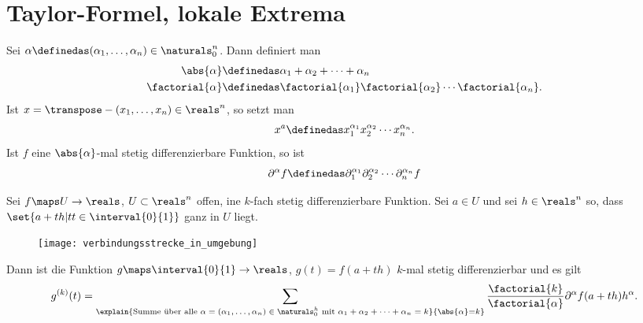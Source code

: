 \section{Taylor-Formel, lokale Extrema}
\begin{notation}
  Sei \( \alpha\definedas(\alpha_1,\dotsc,\alpha_n)\in \naturals_{0}^n \). Dann definiert man
  \begin{align*}
    \abs{\alpha}&\definedas\alpha_1+\alpha_2+\dotsb+\alpha_n\\
    \factorial{\alpha}&\definedas \factorial{\alpha_1}\factorial{\alpha_2}\dotsb\factorial{\alpha_n}.
  \end{align*}
  Ist \( x=\transpose-{(x_1,\dotsc,x_n)}\in \reals^n \), so setzt man 
  \begin{equation*}
    x^{a}\definedas x_1^{\alpha_1}x_2^{\alpha_2}\dotsb x_n^{\alpha_n}.
  \end{equation*}
  Ist \( f \) eine \( \abs{\alpha} \)-mal stetig differenzierbare Funktion, so ist 
  \begin{equation*}
    \partial^{\alpha}f\definedas \partial_1^{\alpha_1}\partial_2^{\alpha_2}\dotsb\partial_n^{\alpha_n}f
  \end{equation*}
\end{notation}
\begin{lemma}\label{funktion_entlang_gerade_ableitung}
  Sei \( f\maps U\to \reals \), \( U\subset \reals^n \) offen, ine \( k \)-fach stetig differenzierbare Funktion. Sei \( a\in U \) und sei \( h\in \reals^n \) so, dass \( \set{a+th|tt\in \interval{0}{1}} \) ganz in \( U \) liegt.
  \begin{figure}[H]
    \centering
    \texttt{[image: verbindungsstrecke\_in\_umgebung]}
    \label{fig:verbindungsstrecke_in_umgebung}
  \end{figure}
  Dann ist die Funktion \( g\maps \interval{0}{1}\to \reals \), \( g(t)=f(a+th) \) \( k \)-mal stetig differenzierbar und es gilt 
  \begin{equation*}
    g^{(k)}(t)=\sum_{\explain{\text{Summe über alle \( \alpha=(\alpha_1,\dotsc,\alpha_n)\in \naturals_0^h \) mit \( \alpha_1+\alpha_2+\dotsb+\alpha_n=k \)}}{\abs{\alpha}=k}}\frac{\factorial{k}}{\factorial{\alpha}}\partial^{\alpha}f(a+th)h^{\alpha}.
  \end{equation*}
\end{lemma}
